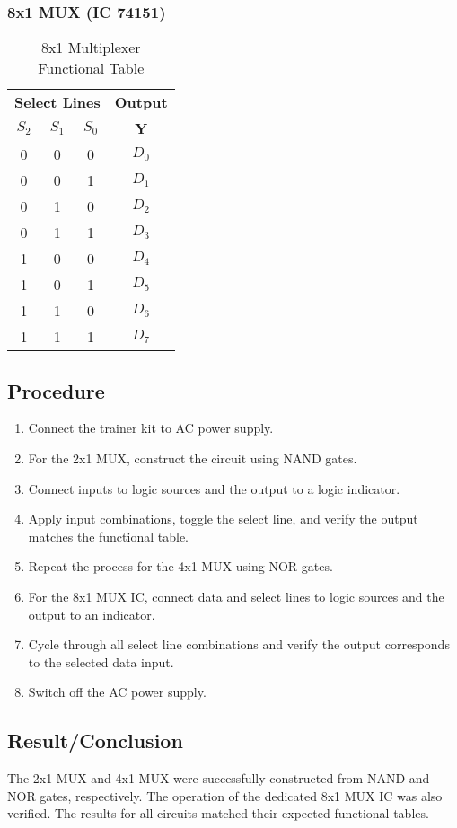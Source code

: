 \documentclass[11pt]{article}
\begin{document}
\subsubsection{8x1 MUX (IC 74151)}
\begin{table}[htbp]
    \centering
    \caption{8x1 Multiplexer Functional Table}
    \begin{tabular}{ccc c}
        \toprule
        \multicolumn{3}{c}{\textbf{Select Lines}} & \textbf{Output} \\
        \cmidrule(r){1-3}
        \textbf{$S_2$} & \textbf{$S_1$} & \textbf{$S_0$} & \textbf{Y} \\ \midrule
        0 & 0 & 0 & $D_0$ \\
        0 & 0 & 1 & $D_1$ \\
        0 & 1 & 0 & $D_2$ \\
        0 & 1 & 1 & $D_3$ \\
        1 & 0 & 0 & $D_4$ \\
        1 & 0 & 1 & $D_5$ \\
        1 & 1 & 0 & $D_6$ \\
        1 & 1 & 1 & $D_7$ \\ \bottomrule
    \end{tabular}
\end{table}

\subsection{Procedure}
\begin{enumerate}
    \item Connect the trainer kit to AC power supply.
    \item For the 2x1 MUX, construct the circuit using NAND gates.
    \item Connect inputs to logic sources and the output to a logic indicator.
    \item Apply input combinations, toggle the select line, and verify the output matches the functional table.
    \item Repeat the process for the 4x1 MUX using NOR gates.
    \item For the 8x1 MUX IC, connect data and select lines to logic sources and the output to an indicator.
    \item Cycle through all select line combinations and verify the output corresponds to the selected data input.
    \item Switch off the AC power supply.
\end{enumerate}

\subsection{Result/Conclusion}
The 2x1 MUX and 4x1 MUX were successfully constructed from NAND and NOR gates, respectively. The operation of the dedicated 8x1 MUX IC was also verified. The results for all circuits matched their expected functional tables.
\end{document}
